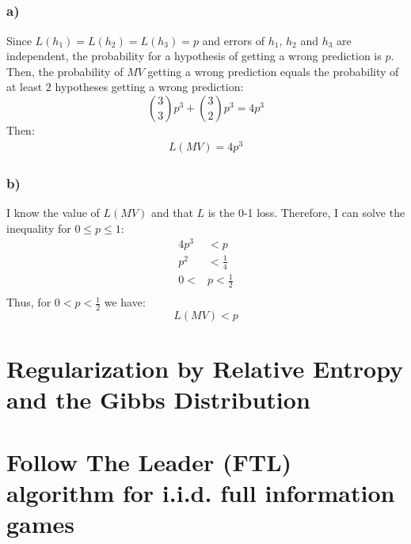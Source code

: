 \documentclass[a4paper]{article}
\begin{document}
\subsection{}
\label{subsec:23}
\subsubsection*{a)}
Since $L(h_1) = L(h_2) = L(h_3) = p$ and errors of $h_1$, $h_2$ and $h_3$ are
independent, the probability for a hypothesis of getting a wrong prediction is
$p$. Then, the probability of $MV$ getting a wrong prediction equals the
probability of at least 2 hypotheses getting a wrong prediction:
\[
\binom{3}{3}p^3 + \binom{3}{2}p^3 = 4p^3
\]
Then:
\begin{align*}
  L(MV) = 4p^3
\end{align*}

\subsubsection*{b)}
I know the value of $L(MV)$ and that $L$ is the 0-1 loss. 
Therefore, I can solve the inequality for $0 \leq p \leq  1$:
\begin{align*}
  4p^3 &< p\\
  p^2 &< \frac{1}{4}\\
  0 < &p < \frac{1}{2}\\
\end{align*}
Thus, for $0 < p < \frac{1}{2}$ we have:
\[
L(MV) < p
\]

\section{Regularization by Relative Entropy and the Gibbs Distribution}
\label{sec:2}

\section{Follow The Leader (FTL) algorithm for i.i.d. full information games}
\label{sec:3}
\end{document}
